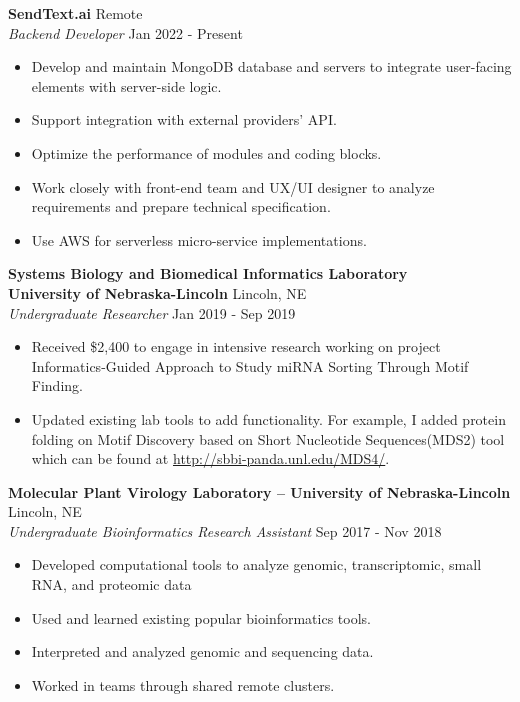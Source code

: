 \documentclass[a4paper]{article}
\begin{document}
\textbf{SendText.ai} \hfill Remote\\
\textit{Backend Developer} \hfill Jan 2022 - Present\\
\vspace{-1mm}
\begin{itemize} \itemsep 1pt
	\item Develop and maintain MongoDB database and servers to integrate user-facing elements with server-side logic.
	\item Support integration with external providers’ API.
	\item Optimize the performance of modules and coding blocks.
	\item Work closely with front-end team and UX/UI designer to analyze requirements and prepare technical specification.
	\item Use AWS for serverless micro-service implementations.
\end{itemize}
\textbf{Systems Biology and Biomedical Informatics Laboratory\\ University of Nebraska-Lincoln} \hfill Lincoln, NE\\
\textit{Undergraduate Researcher} \hfill Jan 2019 - Sep 2019\\
\vspace{-1mm}
\begin{itemize} \itemsep 1pt
	\item Received \$2,400 to engage in intensive research working on project \textquotedbl{}Informatics-Guided Approach to Study miRNA Sorting Through Motif Finding\textquotedbl{}.
	\item Updated existing lab tools to add functionality. For example, I added protein folding on Motif Discovery based on Short Nucleotide Sequences(MDS2) tool which can be found at \url{http://sbbi-panda.unl.edu/MDS4/}.
\end{itemize}
\textbf{Molecular Plant Virology Laboratory – University of Nebraska-Lincoln} \hfill Lincoln, NE\\
\textit{Undergraduate Bioinformatics Research Assistant} \hfill Sep 2017 - Nov 2018\\
\vspace{-1mm}
\begin{itemize} \itemsep 1pt
	\item Developed computational tools to analyze genomic, transcriptomic, small RNA, and proteomic data
	\item Used and learned existing popular bioinformatics tools.
	\item Interpreted and analyzed genomic and sequencing data.
	\item Worked in teams through shared remote clusters.
\end{itemize}
\end{document}
